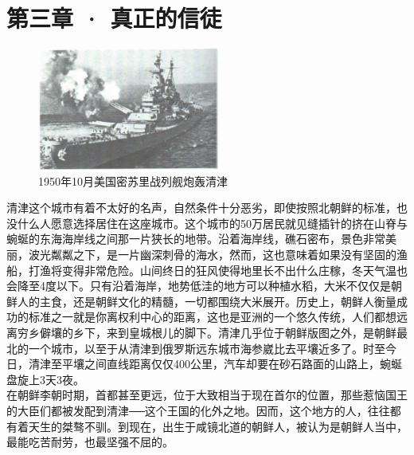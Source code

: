 \fancyhead[RO]{\thepage}
\fancyhead[LE]{\thepage}
\fancyfoot[LE,RO]{}
\fancyfoot[LO,CE]{}
\fancyfoot[CO,RE]{}
\chapter*{第三章 · 真正的信徒}
\begin{figure}[!htbp]
	\centering
	\includegraphics[width=6cm]{./Chapters/Images/03.jpg}
	\caption*{1950年10月美国密苏里战列舰炮轰清津}
\end{figure}

清津这个城市有着不太好的名声，自然条件十分恶劣，即使按照北朝鲜的标准，也没什么人愿意选择居住在这座城市。这个城市的50万居民就见缝插针的挤在山脊与蜿蜒的东海海岸线之间那一片狭长的地带。沿着海岸线，礁石密布，景色非常美丽，波光粼粼之下，是一片幽深刺骨的海水，然而，这也意味着如果没有坚固的渔船，打渔将变得非常危险。山间终日的狂风使得地里长不出什么庄稼，冬天气温也会降至4度以下。只有沿着海岸，地势低洼的地方可以种植水稻，大米不仅仅是朝鲜人的主食，还是朝鲜文化的精髓，一切都围绕大米展开。历史上，朝鲜人衡量成功的标准之一就是你离权利中心的距离，这也是亚洲的一个悠久传统，人们都想远离穷乡僻壤的乡下，来到皇城根儿的脚下。清津几乎位于朝鲜版图之外，是朝鲜最北的一个城市，以至于从清津到俄罗斯远东城市海参崴比去平壤近多了。时至今日，清津至平壤之间直线距离仅仅400公里，汽车却要在砂石路面的山路上，蜿蜒盘旋上3天3夜。\\

在朝鲜李朝时期，首都甚至更远，位于大致相当于现在首尔的位置，那些惹恼国王的大臣们都被发配到清津──这个王国的化外之地。因而，这个地方的人，往往都有着天生的桀骜不驯。到现在，出生于咸镜北道的朝鲜人，被认为是朝鲜人当中，最能吃苦耐劳，也最坚强不屈的。\\

